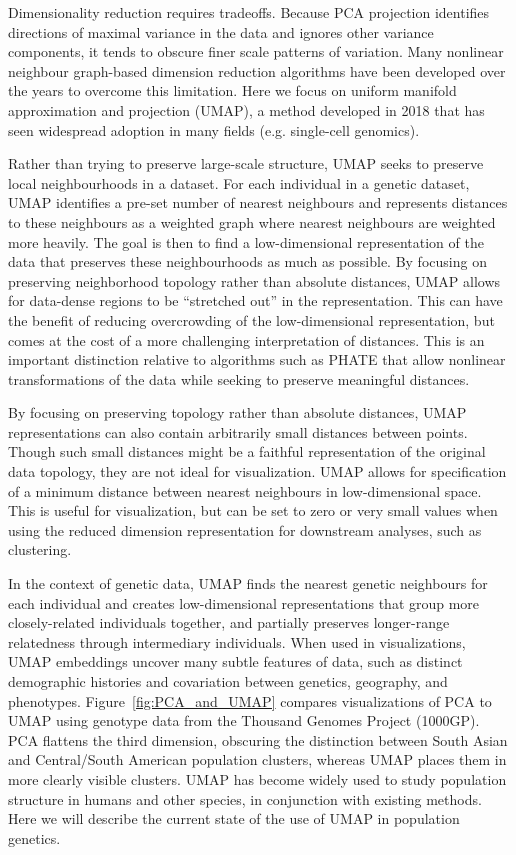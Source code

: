 \documentclass[12pt]{article}
\begin{document}
Dimensionality reduction requires tradeoffs. Because PCA projection identifies directions of maximal variance in the data and ignores other variance components, it tends to obscure finer scale patterns of variation. Many nonlinear neighbour graph-based dimension reduction algorithms have been developed over the years to overcome this limitation. Here we focus on uniform manifold approximation and projection (UMAP)\cite{mcinnes_umap_2018}, a method developed in 2018 that has seen widespread adoption in many fields (e.g. single-cell genomics\cite{becht_dimensionality_2019}). 

Rather than trying to preserve large-scale structure, UMAP seeks to preserve local neighbourhoods in a dataset. For each individual in a genetic dataset, UMAP identifies a pre-set number of nearest neighbours and represents distances to these neighbours as a weighted graph where nearest neighbours are weighted more heavily. The goal is then to find a low-dimensional representation of the data that preserves these neighbourhoods as much as possible. By focusing on preserving neighborhood topology rather than absolute distances, UMAP allows for data-dense regions to be ``stretched out'' in the representation. This can have the benefit of reducing overcrowding of the low-dimensional representation, but comes at the cost of a more challenging interpretation of distances.  This is an important distinction relative to algorithms such as PHATE \cite{moon2019visualizing} that allow nonlinear transformations of the data while seeking to preserve meaningful distances. 

By focusing on preserving topology rather than absolute distances, UMAP representations can also contain arbitrarily small distances between points. Though such small distances might be a faithful representation of the original data topology, they are not ideal for visualization. UMAP allows for specification of a minimum distance between nearest neighbours in low-dimensional space. This is useful for visualization, but can be set to zero or very small values when using the reduced dimension representation for downstream analyses, such as clustering.

In the context of genetic data, UMAP finds the nearest genetic neighbours for each individual and creates low-dimensional representations that group more closely-related individuals together, and partially preserves longer-range relatedness through intermediary individuals. When used in visualizations, UMAP embeddings uncover many subtle features of data, such as distinct demographic histories and covariation between genetics, geography, and phenotypes\cite{diaz-papkovich_umap_2019}. Figure~\ref{fig:PCA_and_UMAP} compares visualizations of PCA to UMAP using genotype data from the Thousand Genomes Project (1000GP)\cite{10002015global}. PCA flattens the third dimension, obscuring the distinction between South Asian and Central/South American population clusters, whereas UMAP places them in more clearly visible clusters. UMAP has become widely used to study population structure in humans and other species, in conjunction with existing methods. Here we will describe the current state of the use of UMAP in population genetics.
\end{document}
